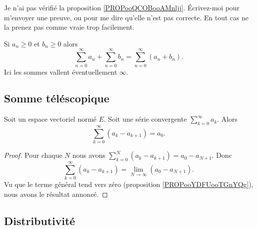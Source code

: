 \begin{probleme}
	Je n'ai pas vérifié la proposition \ref{PROPooQCOBooAMnljj}. Écrivez-moi pour m'envoyer une preuve, ou pour me dire qu'elle n'est pas correcte. En tout cas ne la prenez pas comme vraie trop facilement.
\end{probleme}

\begin{proposition}		\label{PROPooQCOBooAMnljj}
	Si \( a_n\geq 0\) et \( b_n\geq 0\) alors
	\begin{equation}
		\sum_{n=0}^{\infty}a_n+\sum_{n=0}^{\infty}b_n=\sum_{n=0}^{\infty}(a_n+b_n).
	\end{equation}
	Ici les sommes vallent éventuellement \( \infty\).
\end{proposition}

\subsection{Somme téléscopique}

\begin{proposition}	\label{PROPooQLOUooTDWfFF}
	Soit un espace vectoriel normé \( E\). Soit une série convergente \( \sum_{k=0}^{\infty}a_k\). Alors
	\begin{equation}
		\sum_{k=0}^{\infty}(a_k-a_{k+1})=a_0.
	\end{equation}
\end{proposition}

\begin{proof}
	Pour chaque \( N\) nous avons \( \sum_{k=0}^N(a_k-a_{k+1})=a_0-a_{N+1}\). Donc
	\begin{equation}
		\sum_{k=0}^{\infty}(a_k-a_{k+1})=\lim_{N\to \infty}(a_0-a_{N+1}).
	\end{equation}
	Vu que le terme général tend vers zéro (proposition \ref{PROPooYDFUooTGnYQg}), nous avons le résultat annoncé.
\end{proof}

\subsection{Distributivité}

